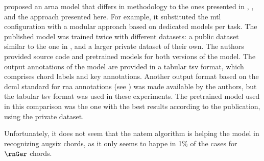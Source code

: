 
\textcite{mcleod2021modular} proposed an \gls{arna} model
that differs in methodology to the ones presented in
\textcite{chen2021attend}, \textcite{micchi2021deep}, and
the approach presented here. For example, it substituted the
\gls{mtl} configuration with a modular approach based on
dedicated models per task. The published model was trained
twice with different datasets: a public dataset similar to
the one in \textcite{micchi2021deep}, and a larger private
dataset of their own. The authors provided source code and
pretrained models for both versions of the model. The output
annotations of the model are provided in a tabular \gls{tsv}
format, which comprises chord labels and key annotations.
Another output format based on the \gls{dcml} standard for
\gls{rna} annotations (see )
was made available by the authors, but the tabular \gls{tsv}
format was used in these experiments. The pretrained model
used in this comparison was the one with the best results
according to the publication, using the private dataset.

Unfortunately, it does not seem that the \gls{natem}
algorithm is helping the \textcite{mcleod2021modular} model
in recognizing \gls{augsix} chords, as it only seems to
happe in 1\% of the cases for $\rnGer$ chords.
